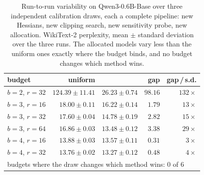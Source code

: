 \begin{table}[H]
\centering
\small
\setlength{\tabcolsep}{5pt}
\caption{Run-to-run variability on Qwen3-0.6B-Base over three independent calibration draws, each a complete pipeline: new Hessians, new clipping search, new sensitivity probe, new allocation. WikiText-2 perplexity, mean $\pm$ standard deviation over the three runs. The allocated models vary less than the uniform ones exactly where the budget binds, and no budget changes which method wins.}
\label{tab:seeds}
\begin{tabular}{lrrrr}
\toprule
budget & uniform & \method{} & gap & gap\,/\,s.d. \\
\midrule
$b=2$, $r=32$ & $124.39 \pm 11.41$ & $26.23 \pm 0.74$ & $98.16$ & $132\times$ \\
$b=3$, $r=16$ & $18.00 \pm 0.11$ & $16.22 \pm 0.14$ & $1.79$ & $13\times$ \\
$b=3$, $r=32$ & $17.60 \pm 0.04$ & $14.78 \pm 0.19$ & $2.82$ & $15\times$ \\
$b=3$, $r=64$ & $16.86 \pm 0.03$ & $13.48 \pm 0.12$ & $3.38$ & $29\times$ \\
$b=4$, $r=16$ & $13.88 \pm 0.03$ & $13.57 \pm 0.11$ & $0.31$ & $3\times$ \\
$b=4$, $r=32$ & $13.76 \pm 0.02$ & $13.27 \pm 0.12$ & $0.48$ & $4\times$ \\
\midrule
\multicolumn{5}{l}{budgets where the draw changes which method wins: 0 of 6} \\
\bottomrule
\end{tabular}
\end{table}
